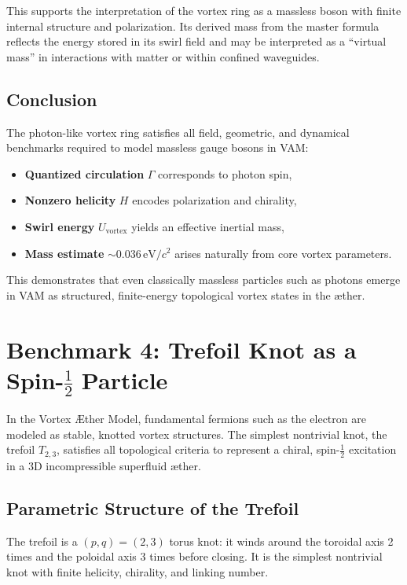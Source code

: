\documentclass[preprint]{revtex4-2}
\begin{document}
This supports the interpretation of the vortex ring as a massless boson with finite internal structure and polarization. Its derived mass from the master formula reflects the energy stored in its swirl field and may be interpreted as a “virtual mass” in interactions with matter or within confined waveguides.

\subsection{Conclusion}

The photon-like vortex ring satisfies all field, geometric, and dynamical benchmarks required to model massless gauge bosons in VAM:

\begin{itemize}
    \item \textbf{Quantized circulation} $\Gamma$ corresponds to photon spin,
    \item \textbf{Nonzero helicity} $H$ encodes polarization and chirality,
    \item \textbf{Swirl energy} $U_{\text{vortex}}$ yields an effective inertial mass,
    \item \textbf{Mass estimate} \(\sim 0.036 \, \text{eV}/c^2\) arises naturally from core vortex parameters.
\end{itemize}

This demonstrates that even classically massless particles such as photons emerge in VAM as structured, finite-energy topological vortex states in the æther.
\section{Benchmark 4: Trefoil Knot as a Spin-\texorpdfstring{$\tfrac{1}{2}$}{1/2} Particle}

In the Vortex Æther Model, fundamental fermions such as the electron are modeled as stable, knotted vortex structures. The simplest nontrivial knot, the trefoil \( T_{2,3} \), satisfies all topological criteria to represent a chiral, spin-\(\tfrac{1}{2}\) excitation in a 3D incompressible superfluid æther.

\subsection{Parametric Structure of the Trefoil}

The trefoil is a \((p, q) = (2, 3)\) torus knot: it winds around the toroidal axis 2 times and the poloidal axis 3 times before closing. It is the simplest nontrivial knot with finite helicity, chirality, and linking number.
\end{document}
